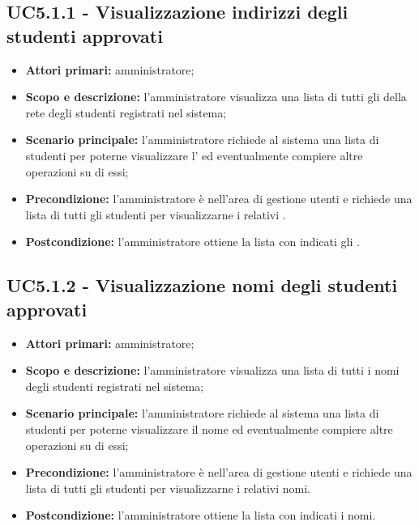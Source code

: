 \documentclass[AnalisiDeiRequisiti.tex]{subfiles}
\begin{document}
\subsection{UC5.1.1 - Visualizzazione indirizzi degli studenti approvati}
\begin{itemize}
	\item \textbf{Attori primari:} amministratore;
	\item \textbf{Scopo e descrizione:} l'amministratore visualizza una lista di tutti gli  della rete  degli studenti registrati nel sistema;
	\item \textbf{Scenario principale:} l'amministratore richiede al sistema una lista di studenti per poterne visualizzare l' ed eventualmente compiere altre operazioni su di essi;
	\item \textbf{Precondizione:} l'amministratore è nell'area di gestione utenti e richiede una lista di tutti gli studenti per visualizzarne i relativi .
	\item \textbf{Postcondizione:} l'amministratore ottiene la lista con indicati gli .
\end{itemize}
\subsection{UC5.1.2 - Visualizzazione nomi degli studenti approvati}
\begin{itemize}
	\item \textbf{Attori primari:} amministratore;
	\item \textbf{Scopo e descrizione:} l'amministratore visualizza una lista di tutti i nomi degli studenti registrati nel sistema;
	\item \textbf{Scenario principale:} l'amministratore richiede al sistema una lista di studenti per poterne visualizzare il nome ed eventualmente compiere altre operazioni su di essi;
	\item \textbf{Precondizione:} l'amministratore è nell'area di gestione utenti e richiede una lista di tutti gli studenti per visualizzarne i relativi nomi.
	\item \textbf{Postcondizione:} l'amministratore ottiene la lista con indicati i nomi.
\end{itemize}
\end{document}
